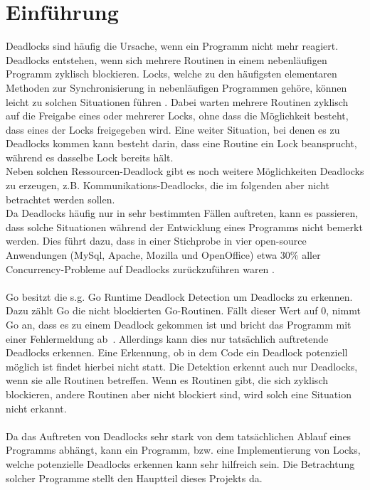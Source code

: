 \chapter{Einführung}
Deadlocks sind häufig die Ursache, wenn ein Programm nicht mehr reagiert\cite{Joshi}.
Deadlocks entstehen, wenn sich mehrere Routinen in einem nebenläufigen 
Programm zyklisch blockieren. Locks, welche zu den häufigsten elementaren 
Methoden zur Synchronisierung in nebenläufigen Programmen gehöre, können 
leicht zu solchen Situationen führen \cite{zhou}. Dabei warten mehrere Routinen 
zyklisch auf die Freigabe eines oder mehrerer Locks, ohne dass die Möglichkeit
besteht, dass eines der Locks freigegeben wird. Eine weiter Situation, 
bei denen es zu Deadlocks kommen kann besteht darin, dass eine Routine 
ein Lock beansprucht, während es dasselbe Lock bereits hält.\\ 
Neben solchen Ressourcen-Deadlock gibt es noch weitere Möglichkeiten Deadlocks 
zu erzeugen, z.B. Kommunikations-Deadlocks, die im folgenden aber nicht betrachtet 
werden sollen. \\
Da Deadlocks häufig nur in sehr bestimmten Fällen auftreten, kann es passieren,
dass solche Situationen während der Entwicklung eines Programms nicht bemerkt
werden. Dies führt dazu, dass in einer Stichprobe in vier open-source Anwendungen 
(MySql, Apache, Mozilla und OpenOffice) etwa $30 \%$ aller Concurrency-Probleme 
auf Deadlocks zurückzuführen waren \cite{Lu}.\\\\
Go besitzt die s.g. Go Runtime Deadlock Detection um Deadlocks zu erkennen. 
Dazu zählt Go die nicht blockierten Go-Routinen.
Fällt dieser Wert auf $0$, nimmt Go an, dass es zu einem Deadlock gekommen 
ist und bricht das Programm mit einer Fehlermeldung ab~\cite{grdd_code}.
Allerdings kann 
dies nur tatsächlich auftretende Deadlocks erkennen. Eine Erkennung, ob 
in dem Code ein Deadlock potenziell möglich ist findet hierbei nicht statt. Die 
Detektion erkennt auch nur Deadlocks, wenn sie alle Routinen betreffen. 
Wenn es Routinen gibt, die sich zyklisch blockieren, andere Routinen aber 
nicht blockiert sind, wird solch eine Situation nicht erkannt.\\\\
Da das Auftreten von Deadlocks sehr stark von dem tatsächlichen Ablauf eines 
Programms abhängt, kann ein Programm, bzw. eine Implementierung 
von Locks, welche potenzielle Deadlocks erkennen kann sehr hilfreich sein.
Die Betrachtung solcher Programme stellt den Hauptteil dieses Projekts da.
